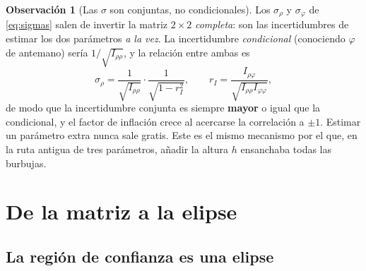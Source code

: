 \documentclass[11pt,a4paper]{article}
\theoremstyle{definition}
\newtheorem{obs}{Observación}
\theoremstyle{plain}
\begin{document}
\begin{obs}[Las $\sigma$ son conjuntas, no condicionales]
Los $\sigma_\rho$ y $\sigma_\varphi$ de \eqref{eq:sigmas} salen de invertir la
matriz $2\times2$ \emph{completa}: son las incertidumbres de estimar los dos
parámetros \emph{a la vez}. La incertidumbre \emph{condicional} (conociendo
$\varphi$ de antemano) sería $1/\sqrt{I_{\rho\rho}}$, y la relación entre ambas
es
%
\[
\sigma_\rho = \frac{1}{\sqrt{I_{\rho\rho}}}\cdot
              \frac{1}{\sqrt{1-r_I^2}},
\qquad
r_I=\frac{I_{\rho\varphi}}{\sqrt{I_{\rho\rho}I_{\varphi\varphi}}} ,
\]
%
de modo que la incertidumbre conjunta es siempre \textbf{mayor} o igual que la
condicional, y el factor de inflación crece al acercarse la correlación a $\pm1$.
Estimar un parámetro extra nunca sale gratis. Este es el mismo mecanismo por el
que, en la ruta antigua de tres parámetros, añadir la altura $h$ ensanchaba
todas las burbujas.
\end{obs}

\section{De la matriz a la elipse}
\label{sec:elipse}

\subsection{La región de confianza es una elipse}
\end{document}
